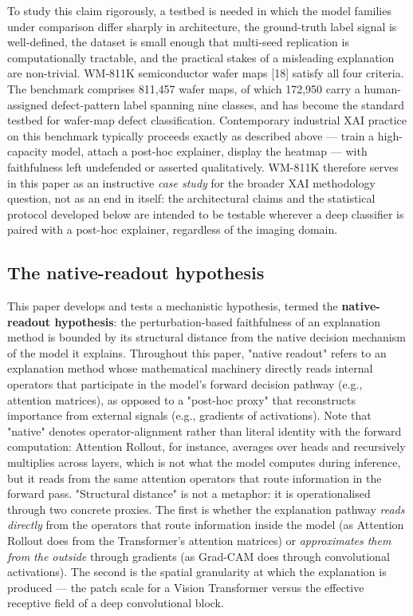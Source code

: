 \documentclass[11pt,a4paper]{article}
\begin{document}
To study this claim rigorously, a testbed is needed in which the model families under comparison differ sharply in architecture, the ground-truth label signal is well-defined, the dataset is small enough that multi-seed replication is computationally tractable, and the practical stakes of a misleading explanation are non-trivial. WM-811K semiconductor wafer maps [18] satisfy all four criteria. The benchmark comprises 811,457 wafer maps, of which 172,950 carry a human-assigned defect-pattern label spanning nine classes, and has become the standard testbed for wafer-map defect classification. Contemporary industrial XAI practice on this benchmark typically proceeds exactly as described above --- train a high-capacity model, attach a post-hoc explainer, display the heatmap --- with faithfulness left undefended or asserted qualitatively. WM-811K therefore serves in this paper as an
instructive \emph{case study} for the broader XAI methodology question, not as an end in itself: the architectural claims and the statistical protocol developed below are intended to be testable wherever a deep classifier is paired with a post-hoc explainer, regardless of the imaging domain.

\subsection{The native-readout hypothesis}

This paper develops and tests a mechanistic hypothesis, termed the \textbf{native-readout hypothesis}: the perturbation-based faithfulness of an explanation method is bounded by its structural distance from the native decision mechanism of the model it explains. Throughout this paper, "native readout" refers to an explanation method whose mathematical machinery directly reads internal operators that participate in the model's forward decision pathway (e.g., attention matrices), as opposed to a "post-hoc proxy" that reconstructs importance from external signals (e.g., gradients of activations). Note that "native" denotes operator-alignment rather than literal identity with the forward computation: Attention Rollout, for instance, averages over heads and recursively multiplies across layers, which is not what the model computes during inference, but it reads from the same attention
operators that route information in the forward pass. "Structural distance" is not a metaphor: it is operationalised through two concrete proxies. The first is whether the explanation pathway \emph{reads directly} from the operators that route information inside the model (as Attention Rollout does from the Transformer's attention matrices) or \emph{approximates them from the outside} through gradients (as Grad-CAM does through convolutional activations). The second is the spatial granularity at which the explanation is produced --- the patch scale for a Vision Transformer versus the effective receptive field of a deep convolutional block.
\end{document}

